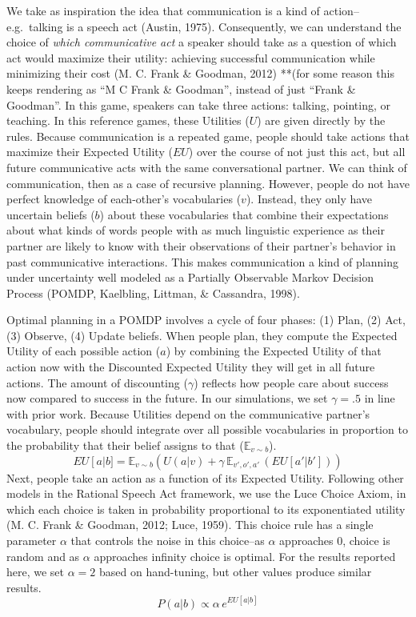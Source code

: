 \documentclass[10pt, letterpaper]{article}
\begin{document}
We take as inspiration the idea that communication is a kind of
action--e.g.~talking is a speech act (Austin, 1975). Consequently, we
can understand the choice of \emph{which communicative act} a speaker
should take as a question of which act would maximize their utility:
achieving successful communication while minimizing their cost (M. C.
Frank \& Goodman, 2012) **(for some reason this keeps rendering as ``M C
Frank \& Goodman'', instead of just ``Frank \& Goodman''. In this game,
speakers can take three actions: talking, pointing, or teaching. In this
reference games, these Utilities (\(U\)) are given directly by the
rules. Because communication is a repeated game, people should take
actions that maximize their Expected Utility (\(EU\)) over the course of
not just this act, but all future communicative acts with the same
conversational partner. We can think of communication, then as a case of
recursive planning. However, people do not have perfect knowledge of
each-other's vocabularies (\(v\)). Instead, they only have uncertain
beliefs (\(b\)) about these vocabularies that combine their expectations
about what kinds of words people with as much linguistic experience as
their partner are likely to know with their observations of their
partner's behavior in past communicative interactions. This makes
communication a kind of planning under uncertainty well modeled as a
Partially Observable Markov Decision Process (POMDP, Kaelbling, Littman,
\& Cassandra, 1998).

Optimal planning in a POMDP involves a cycle of four phases: (1) Plan,
(2) Act, (3) Observe, (4) Update beliefs. When people plan, they compute
the Expected Utility of each possible action (\(a\)) by combining the
Expected Utility of that action now with the Discounted Expected Utility
they will get in all future actions. The amount of discounting
(\(\gamma\)) reflects how people care about success now compared to
success in the future. In our simulations, we set \(\gamma=.5\) in line
with prior work. Because Utilities depend on the communicative partner's
vocabulary, people should integrate over all possible vocabularies in
proportion to the probability that their belief assigns to that
(\(\mathbb{E}_{v \sim b}\)). \[
EU\left[a\right | b] = \mathbb{E}_{v \sim b} \left(U(a|v) + \gamma \,\mathbb{E}_{v',o',a'} \,\left( EU\left[a' | b'\right]\right)\right)
\] Next, people take an action as a function of its Expected Utility.
Following other models in the Rational Speech Act framework, we use the
Luce Choice Axiom, in which each choice is taken in probability
proportional to its exponentiated utility (M. C. Frank \& Goodman, 2012;
Luce, 1959). This choice rule has a single parameter \(\alpha\) that
controls the noise in this choice--as \(\alpha\) approaches 0, choice is
random and as \(\alpha\) approaches infinity choice is optimal. For the
results reported here, we set \(\alpha = 2\) based on hand-tuning, but
other values produce similar results. \[ 
P\left(a|b\right) \propto \alpha \, e^{EU[a|b]}
\]
\end{document}
